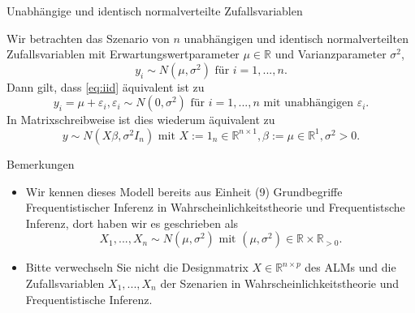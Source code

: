 \documentclass[
  8pt,
  ignorenonframetext,
]{beamer}
\providecommand{\tightlist}{%
  \setlength{\itemsep}{0pt}\setlength{\parskip}{0pt}}
\begin{document}
\begin{frame}{Unabhängige und identisch normalverteilte
Zufallsvariablen}
\protect\hypertarget{unabhuxe4ngige-und-identisch-normalverteilte-zufallsvariablen}{}
\footnotesize

Wir betrachten das Szenario von \(n\) unabhängigen und identisch
normalverteilten Zufallsvariablen mit Erwartungswertparameter
\(\mu \in \mathbb{R}\) und Varianzparameter \(\sigma^2\),
\begin{equation}\label{eq:iid}
y_i \sim N(\mu,\sigma^2) \mbox{ für } i = 1,...,n.
\end{equation} Dann gilt, dass \eqref{eq:iid} äquivalent ist zu
\begin{equation}
y_i = \mu + \varepsilon_i, \varepsilon_i \sim N(0,\sigma^2) \mbox{ für } i = 1,...,n \mbox{ mit unabhängigen } \varepsilon_i.
\end{equation} In Matrixschreibweise ist dies wiederum äquivalent zu
\begin{equation}
y \sim N(X\beta,\sigma^2I_n) \mbox{ mit } X := 1_n\in \mathbb{R}^{n \times 1}, \beta := \mu \in \mathbb{R}^1, \sigma^2>0.
\end{equation}

Bemerkungen

\begin{itemize}
\tightlist
\item
  \justifying Wir kennen dieses Modell bereits aus Einheit (9)
  Grundbegriffe Frequentistischer Inferenz in Wahrscheinlichkeitstheorie
  und Frequentistsche Inferenz, dort haben wir es geschrieben als
  \begin{equation}
  X_1,...,X_n \sim N(\mu,\sigma^2) \mbox{ mit } (\mu,\sigma^2) \in \mathbb{R} \times \mathbb{R}_{>0}.
  \end{equation}
\item
  Bitte verwechseln Sie nicht die Designmatrix
  \(X \in \mathbb{R}^{n \times p}\) des ALMs und die Zufallsvariablen
  \(X_1,...,X_n\) der Szenarien in Wahrscheinlichkeitstheorie und
  Frequentistische Inferenz.
\end{itemize}
\end{frame}
\end{document}
